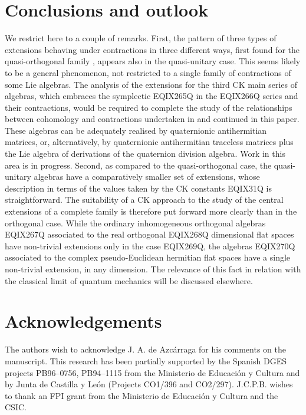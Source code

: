 \section{Conclusions and outlook}

We restrict here to a couple of remarks. First, the pattern of three
types of extensions behaving under contractions in three different ways,
first found for the quasi-orthogonal family \cite{Azc.Her.Bue.San:96}, appears
also in the quasi-unitary
case. This seems likely to be a general phenomenon, not restricted to a single
family of contractions of some Lie algebras. The analysis of the extensions for
the
third CK main series of algebras, which embraces the symplectic
EQIX265Q in
the EQIX266Q series and their contractions, would be required to complete the
study of the relationships between cohomology and contractions undertaken
in \cite{Azc.Her.Bue.San:96} and continued in this paper.
These algebras can be adequately realised by quaternionic antihermitian
matrices, or, alternatively, by quaternionic antihermitian traceless matrices
plus
the Lie algebra of derivations of the quaternion
division algebra. Work in this area is in progress. Second, as compared to the
quasi-orthogonal case, the
quasi-unitary algebras have a comparatively smaller set of
extensions, whose description in terms of the values taken by the CK constants
EQIX31Q is straightforward. The suitability of a CK approach to the study of the
central extensions of a complete family is therefore put forward more clearly
than in the orthogonal case.
While the ordinary inhomogeneous orthogonal algebras
EQIX267Q associated to the real orthogonal EQIX268Q
dimensional flat spaces have
non-trivial extensions only in the case EQIX269Q, the algebras EQIX270Q
associated to
the complex pseudo-Euclidean hermitian flat spaces have a
single non-trivial extension, in any dimension. The
relevance of this fact in relation with the classical limit of quantum
mechanics
will be discussed elsewhere.

\section*{Acknowledgements}
The authors wish to acknowledge J. A. de Azc\'arraga for his comments on the
manuscript.
This research has been partially supported by the Spanish DGES
projects PB96--0756, PB94--1115
from the Ministerio de Educaci\'on y Cultura and by Junta de Castilla y
Le\'on (Projects CO1/396 and CO2/297). J.C.P.B.
wishes to thank an FPI grant from the Ministerio de Educaci\'on y
Cultura and the CSIC.

